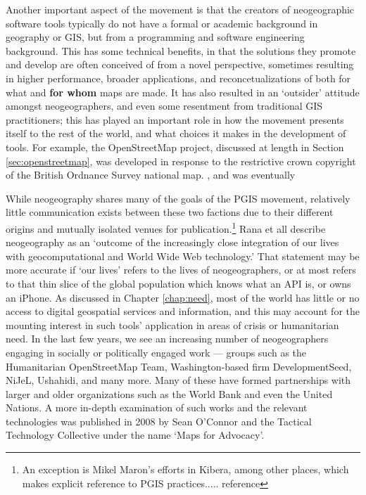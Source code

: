 \documentclass[11pt,oneside,notitlepage]{report}
\begin{document}
Another important aspect of the movement is that the creators of neogeographic software tools typically do not have a formal or academic background in geography or GIS, but from a programming and software engineering background. This has some technical benefits, in that the solutions they promote and develop are often conceived of from a novel perspective, sometimes resulting in higher performance, broader applications, and reconcetualizations of both for what and \textbf{for whom} maps are made. It has also resulted in an `outsider' attitude amongst neogeographers, and even some resentment from traditional GIS practitioners; this has played an important role in how the movement presents itself to the rest of the world, and what choices it makes in the development of tools. For example, the OpenStreetMap project, discussed at length in Section \ref{sec:openstreetmap}, was developed in response to the restrictive crown copyright of the British Ordnance Survey national map. \cite{chilton-crowdsourcing}, and was eventually 

While neogeography shares many of the goals of the \ac{PGIS} movement, relatively little communication exists between these two factions due to their different origins and mutually isolated venues for publication.\footnote{An exception is Mikel Maron's efforts in Kibera, among other places, which makes explicit reference to \ac{PGIS} practices..... reference} Rana et all describe neogeography as an `outcome of the increasingly close integration of our lives with geocomputational and World Wide Web technology.' That statement may be more accurate if `our lives' refers to the lives of neogeographers, or at most refers to that thin slice of the global population which knows what an \ac{API} is, or owns an iPhone. As discussed in Chapter \ref{chap:need}, most of the world has little or no access to digital geospatial services and information, and this may account for the mounting interest in such tools' application in areas of crisis or humanitarian need. In the last few years, we see an increasing number of neogeographers engaging in socially or politically engaged work --- groups such as the Humanitarian OpenStreetMap Team, Washington-based firm DevelopmentSeed, NiJeL, Ushahidi, and many more. Many of these have formed partnerships with larger and older organizations such as the World Bank and even the United Nations. A more in-depth examination of such works and the relevant technologies was published in 2008 by Sean O'Connor and the Tactical Technology Collective under the name `Maps for Advocacy'. \cite{oconnor2008maps} 
\end{document}
